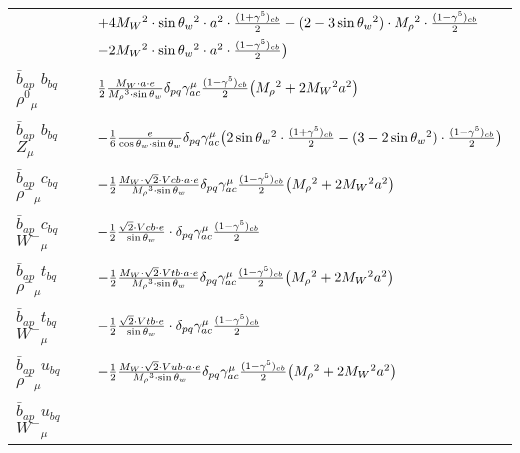 \begin{center}
\begin{tabular}{|l|l|}
  & $+4 M_W{}^2 \cdot  \sin{\theta}_w{}^2 \cdot  a{}^2 \cdot {(1+\gamma^5)_{c b}\over 2} - (2-3 \sin{\theta}_w {}^2)\cdot  M_\rho{}^2 \cdot {(1-\gamma^5)_{c b}\over 2} $ \\[2mm]
  & $-2 M_W{}^2 \cdot  \sin{\theta}_w{}^2 \cdot  a{}^2 \cdot {(1-\gamma^5)_{c b}\over 2} \big)$\\[2mm]
$\bar{b}{}_{a p }$ \phantom{-} $b{}_{b q }$ \phantom{-} $\rho^0{}_{\mu }$ \phantom{-}  &
	$\frac{1}{2}\frac{ M_W \cdot a \cdot e}{ M_\rho{}^3  \cdot \sin{\theta}_w}\delta_{p q} \gamma_{a c}^\mu {(1-\gamma^5)_{c b}\over 2} \big( M_\rho{}^2 +2 M_W{}^2  a{}^2 \big)$\\[2mm]
$\bar{b}{}_{a p }$ \phantom{-} $b{}_{b q }$ \phantom{-} ${Z}_{\mu }$ \phantom{-}  &
	$-\frac{1}{6}\frac{ e}{ \cos{\theta}_w \cdot \sin{\theta}_w}\delta_{p q} \gamma_{a c}^\mu \big(2 \sin{\theta}_w{}^2 \cdot {(1+\gamma^5)_{c b}\over 2} - (3-2 \sin{\theta}_w {}^2)\cdot {(1-\gamma^5)_{c b}\over 2} \big)$\\[2mm]
$\bar{b}{}_{a p }$ \phantom{-} $c{}_{b q }$ \phantom{-} $\rho^-{}_{\mu }$ \phantom{-}  &
	$-\frac{1}{2}\frac{ M_W \cdot\sqrt{2} \cdot Vcb \cdot a \cdot e}{ M_\rho{}^3  \cdot \sin{\theta}_w}\delta_{p q} \gamma_{a c}^\mu {(1-\gamma^5)_{c b}\over 2} \big( M_\rho{}^2 +2 M_W{}^2  a{}^2 \big)$\\[2mm]
$\bar{b}{}_{a p }$ \phantom{-} $c{}_{b q }$ \phantom{-} $W^-{}_{\mu }$ \phantom{-}  &
	$-\frac{1}{2}\frac{\sqrt{2} \cdot Vcb \cdot e}{ \sin{\theta}_w}\cdot \delta_{p q} \gamma_{a c}^\mu {(1-\gamma^5)_{c b}\over 2} $\\[2mm]
$\bar{b}{}_{a p }$ \phantom{-} $t{}_{b q }$ \phantom{-} $\rho^-{}_{\mu }$ \phantom{-}  &
	$-\frac{1}{2}\frac{ M_W \cdot\sqrt{2} \cdot Vtb \cdot a \cdot e}{ M_\rho{}^3  \cdot \sin{\theta}_w}\delta_{p q} \gamma_{a c}^\mu {(1-\gamma^5)_{c b}\over 2} \big( M_\rho{}^2 +2 M_W{}^2  a{}^2 \big)$\\[2mm]
$\bar{b}{}_{a p }$ \phantom{-} $t{}_{b q }$ \phantom{-} $W^-{}_{\mu }$ \phantom{-}  &
	$-\frac{1}{2}\frac{\sqrt{2} \cdot Vtb \cdot e}{ \sin{\theta}_w}\cdot \delta_{p q} \gamma_{a c}^\mu {(1-\gamma^5)_{c b}\over 2} $\\[2mm]
$\bar{b}{}_{a p }$ \phantom{-} $u{}_{b q }$ \phantom{-} $\rho^-{}_{\mu }$ \phantom{-}  &
	$-\frac{1}{2}\frac{ M_W \cdot\sqrt{2} \cdot Vub \cdot a \cdot e}{ M_\rho{}^3  \cdot \sin{\theta}_w}\delta_{p q} \gamma_{a c}^\mu {(1-\gamma^5)_{c b}\over 2} \big( M_\rho{}^2 +2 M_W{}^2  a{}^2 \big)$\\[2mm]
$\bar{b}{}_{a p }$ \phantom{-} $u{}_{b q }$ \phantom{-} $W^-{}_{\mu }$ \phantom{-}  &

\end{tabular}
\end{center}
